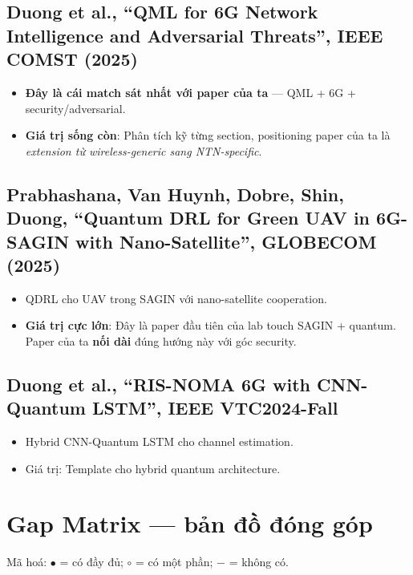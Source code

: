 \documentclass[11pt,a4paper]{article}
\begin{document}
\subsection{Duong et al., ``QML for 6G Network Intelligence and Adversarial Threats'', IEEE COMST (2025)}
\begin{itemize}
  \item \textbf{Đây là cái match sát nhất với paper của ta} --- QML + 6G + security/adversarial.
  \item \textbf{Giá trị sống còn}: Phân tích kỹ từng section, positioning paper của ta là \textit{extension từ wireless-generic sang NTN-specific}.
\end{itemize}

\subsection{Prabhashana, Van Huynh, Dobre, Shin, \textbf{Duong}, ``Quantum DRL for Green UAV in 6G-SAGIN with Nano-Satellite'', GLOBECOM (2025)}
\begin{itemize}
  \item QDRL cho UAV trong SAGIN với nano-satellite cooperation.
  \item \textbf{Giá trị cực lớn}: Đây là paper đầu tiên của lab touch SAGIN + quantum. Paper của ta \textbf{nối dài} đúng hướng này với góc security.
\end{itemize}

\subsection{Duong et al., ``RIS-NOMA 6G with CNN-Quantum LSTM'', IEEE VTC2024-Fall}
\begin{itemize}
  \item Hybrid CNN-Quantum LSTM cho channel estimation.
  \item Giá trị: Template cho hybrid quantum architecture.
\end{itemize}

\section{Gap Matrix --- bản đồ đóng góp}

Mã hoá: $\bullet$ = có đầy đủ; $\circ$ = có một phần; $-$ = không có.
\end{document}
